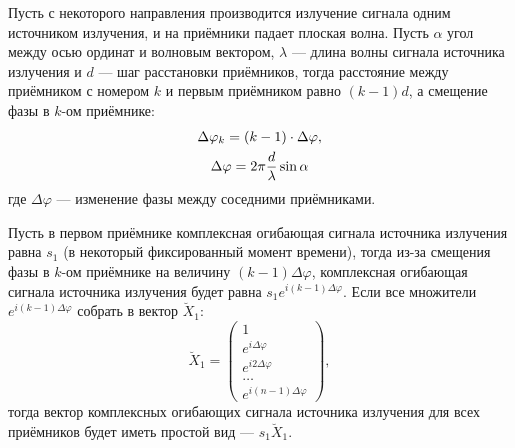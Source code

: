 Пусть с некоторого направления производится излучение сигнала одним источником излучения, и на приёмники падает плоская волна. Пусть $\alpha$
угол между осью ординат и волновым вектором, $\lambda$ --- длина волны сигнала источника излучения и $d$ --- шаг расстановки приёмников, тогда расстояние между
приёмником с номером $k$ и первым приёмником равно $(k-1) d$, а смещение фазы в $k$-ом приёмнике:
\begin{gather}
    \Delta \varphi_k
    = (k-1) \cdot \Delta \varphi, \notag \\
    \Delta \varphi
    = 2 \pi \frac{d}{\lambda} \sin \alpha
    \label{jammers:single:phase_shift}
\end{gather}
где $\Delta \varphi$ --- изменение фазы между соседними приёмниками.

Пусть в первом приёмнике комплексная огибающая сигнала источника излучения равна $s_1$ (в некоторый фиксированный момент времени), тогда из-за смещения фазы в
$k$-ом приёмнике на величину $(k-1) \Delta \varphi$, комплексная огибающая сигнала источника излучения будет равна $s_1 e^{i (k-1) \Delta \varphi}$. Если все
множители $e^{i (k-1) \Delta \varphi}$ собрать в вектор $\breve{X}_1$:
\begin{equation}
    \label{jammers:single:direction}
    \breve{X}_1
    =
    \begin{pmatrix}
        1                      \\
        e^{i \Delta \varphi}   \\
        e^{i 2 \Delta \varphi} \\
        \dots                  \\
        e^{i (n-1) \Delta \varphi}
    \end{pmatrix} ,
\end{equation}
тогда вектор комплексных огибающих сигнала источника излучения для всех приёмников будет иметь простой вид --- $s_1 \breve{X}_1$.

